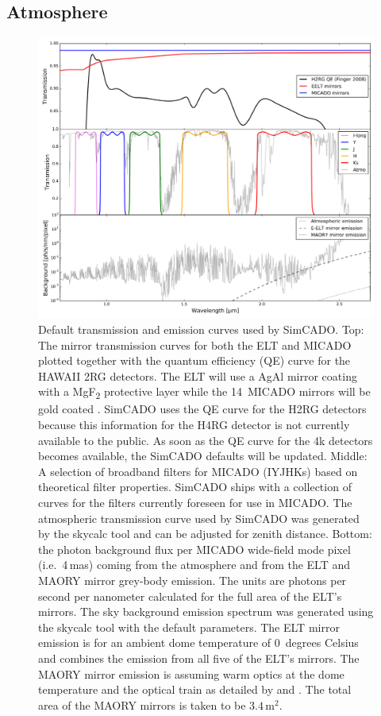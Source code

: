 \subsection{Atmosphere}

\begin{figure}

    \centering
    \includegraphics[width=\textwidth]{images/fig1_spectra}

    \caption{Default transmission and emission curves used by SimCADO. Top: The mirror transmission curves for both the ELT and MICADO plotted together with the quantum efficiency (QE) curve for the HAWAII 2RG detectors. The ELT will use a AgAl mirror coating with a MgF\textsubscript{2} protective layer \citep{boccas06} while the 14~MICADO mirrors will be gold coated \citep{micado2016}. SimCADO uses the QE curve for the H2RG detectors because this information for the H4RG detector is not currently available to the public. As soon as the QE curve for the 4k detectors becomes available, the SimCADO defaults will be updated. Middle: A selection of broadband filters for MICADO (IYJHKs) based on theoretical filter properties. SimCADO ships with a collection of curves for the filters currently foreseen for use in MICADO. The atmospheric transmission curve used by SimCADO was generated by the skycalc tool \citep{skycalc1, skycalc2} and can be adjusted for zenith distance. Bottom: the photon background flux per MICADO wide-field mode pixel (i.e.\ 4\,mas) coming from the atmosphere and from the ELT and MAORY mirror grey-body emission. The units are photons per second per nanometer calculated for the full area of the ELT's mirrors. The sky background emission spectrum was generated using the skycalc tool with the default parameters. The ELT mirror emission is for an ambient dome temperature of 0~degrees Celsius and combines the emission from all five of the ELT's mirrors. The MAORY mirror emission is assuming warm optics at the dome temperature and the optical train as detailed by \citet{maory} and \citet{maory2016}. The total area of the MAORY mirrors is taken to be $3.4\,\mathrm{m}^2$. }
    
    \label{fig:1_spectra}
    
\end{figure}


